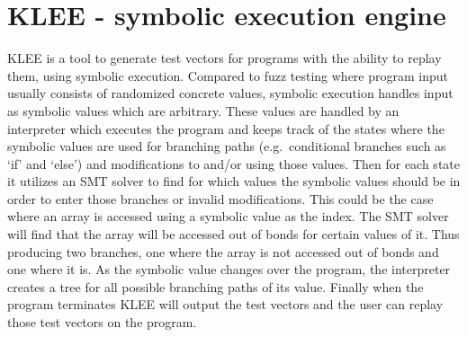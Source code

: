 \section{KLEE - symbolic execution engine}
KLEE\cite{kleepaper} is a tool to generate test vectors for programs with the
ability to replay them, using symbolic execution. Compared to fuzz testing
where program input usually consists of randomized concrete values, symbolic
execution handles input as symbolic values which are arbitrary. These values
are handled by an interpreter which executes the program and keeps track of the
states where the symbolic values are used for branching paths (e.g.\
conditional branches such as `if' and `else') and modifications to and/or using
those values. Then for each state it utilizes an SMT solver to find for which
values the symbolic values should be in order to enter those branches or
invalid modifications. This could be the case where an array is accessed using
a symbolic value as the index. The SMT solver will find that the array will be
accessed out of bonds for certain values of it. Thus producing two branches,
one where the array is not accessed out of bonds and one where it is. As the
symbolic value changes over the program, the interpreter creates a tree for all
possible branching paths of its value. Finally when the program terminates KLEE
will output the test vectors and the user can replay those test vectors on the
program.
